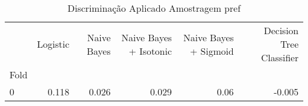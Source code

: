 \begin{table}
\centering
\caption{Discriminação Aplicado Amostragem pref}
\label{Discriminação Aplicado Amostragem pref 8}
\begin{tabular}{lrrrrr}
\toprule
{} &  Logistic &  Naive Bayes &  Naive Bayes + Isotonic &  Naive Bayes + Sigmoid &  Decision Tree Classifier \\
Fold &           &              &                         &                        &                           \\
\midrule
0    &     0.118 &        0.026 &                   0.029 &                   0.06 &                    -0.005 \\
\bottomrule
\end{tabular}
\end{table}
